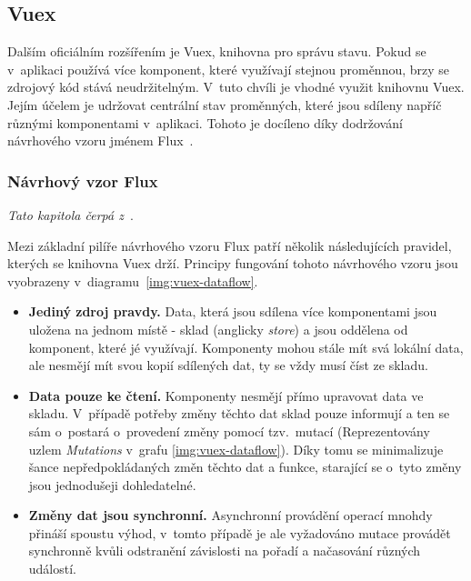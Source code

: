 \subsection{Vuex}
Dalším oficiálním rozšířením je Vuex, knihovna pro správu stavu. Pokud se v~aplikaci používá více komponent, které využívají stejnou proměnnou, brzy se zdrojový kód stává neudržitelným. 
V~tuto chvíli je vhodné využit knihovnu Vuex. Jejím účelem je udržovat centrální stav proměnných, které jsou sdíleny napříč různými komponentami v~aplikaci. Tohoto je docíleno díky dodržování návrhového vzoru jménem Flux~\cite{bib:vuex-doc}. 


\subsubsection*{Návrhový vzor Flux}
\emph{Tato kapitola čerpá z~\cite{bib:vuex-guide}}.

Mezi základní pilíře návrhového vzoru Flux patří několik následujících pravidel, kterých se knihovna Vuex drží. Principy fungování tohoto návrhového vzoru jsou vyobrazeny v~diagramu~\ref{img:vuex-dataflow}.

\begin{itemize}
    \item \textbf{Jediný zdroj pravdy.} Data, která jsou sdílena více komponentami jsou uložena na jednom místě - sklad (anglicky \emph{store}) a jsou oddělena od komponent, které jé využívají. Komponenty mohou stále mít svá lokální data, ale nesmějí mít svou kopií sdílených dat, ty se vždy musí číst ze skladu.
    \item \textbf{Data pouze ke čtení.} Komponenty nesmějí přímo upravovat data ve skladu. V~případě potřeby změny těchto dat sklad pouze informují a ten se sám o~postará o~provedení změny pomocí tzv.~mutací (Reprezentovány uzlem \emph{Mutations} v~grafu \ref{img:vuex-dataflow}). Díky tomu se minimalizuje šance nepředpokládaných změn těchto dat a funkce, starající se o~tyto změny jsou jednodušeji dohledatelné.
    \item \textbf{Změny dat jsou synchronní.} Asynchronní provádění operací mnohdy přináší spoustu výhod, v~tomto případě je ale vyžadováno mutace provádět synchronně kvůli odstranění závislosti na pořadí a načasování různých událostí.
\end{itemize}

